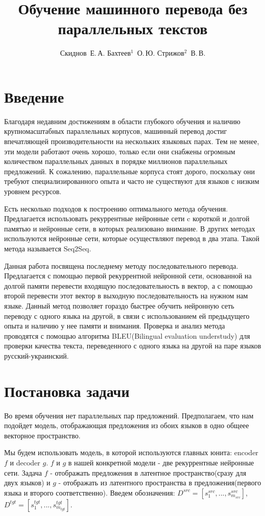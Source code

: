 \documentclass[12pt,twoside]{article}
\title
    [Обучение машинного перевода без параллельных текстов] %
    {Обучение машинного перевода без параллельных текстов}
\author
    [Скиднов~Е.\,А. Бахтеев$^1$~О.\,Ю.  Стрижов$^2$~В.\,В.] %
    {Скиднов~Е.\,А. Бахтеев$^1$~О.\,Ю.  Стрижов$^2$~В.\,В.} %
    [Скиднов~Е.\,А. Бахтеев$^1$~О.\,Ю.  Стрижов$^2$~В.\,В.] %
\begin{document}
\maketitle
\section{Введение}
    Благодаря недавним достижениям в области глубокого обучения и наличию крупномасштабных параллельных корпусов, машинный перевод достиг впечатляющей производительности на нескольких языковых парах. Тем не менее, эти модели работают очень хорошо, только если они снабжены огромным количеством параллельных данных в порядке миллионов параллельных предложений. К сожалению, параллельные корпуса стоят дорого\cite{koehn2009statistical}, поскольку они требуют специализированного опыта и часто не существуют для языков с низким уровнем ресурсов.

    Есть несколько подходов к построению оптимального метода обучения. Предлагается использовать рекуррентные нейронные сети c короткой и долгой памятью и нейронные сети, в которых реализовано внимание. В других методах используются нейронные сети, которые осуществляют перевод в два этапа. Такой метода называется Seq2Seq\cite{weiss2017sequence}.

    Данная работа посвящена последнему методу последовательного перевода. Предлагается с помощью первой рекуррентной нейронной сети, основанной на долгой памяти перевести входящую последовательность в вектор, а с помощью второй перевести этот вектор в выходную последовательность на нужном нам языке\cite{cho2014properties}. Данный метод позволяет гораздо быстрее обучить нейронную сеть переводу с одного языка на другой, в связи с использованием ей предыдущего опыта и наличию у нее памяти и внимания. Проверка и анализ метода проводятся с помощью алгоритма BLEU(Bilingual evaluation understudy) для проверки качества текста, переведенного с одного языка на другой на паре языков русский-украинский.


\section{Постановка задачи}
    Во время обучения нет параллельных пар предложений. Предполагаем, что нам подойдет модель, отображающая предложения из обоих языков в одно общеее векторное пространство.

    Мы будем использовать модель, в которой используются главных юнита: encoder $f$ и decoder $g$. $f$ и $g$  в нашей конкретной модели -  две рекуррентные нейронные сети. Задача $f$  -  отображать предложения в  латентное пространство(сразу для двух языков) и $g$  -  отображать из латентного пространства в предложения(первого языка и второго соответственно).  Введем обозначения: $D^{src} = [s_1^{src},...,s_{m_{src}}^{src}]$, $D^{tgt} = [s_1^{tgt},...,s_{m_{tgt}}^{tgt}]$.
\end{document}

